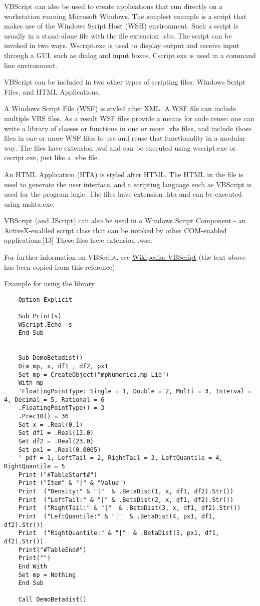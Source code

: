 	\vpara
	VBScript can also be used to create applications that run directly on a workstation running Microsoft Windows. The simplest example is a script that makes use of the Windows Script Host (WSH) environment. Such a script is usually in a stand-alone file with the file extension .vbs. The script can be invoked in two ways. Wscript.exe is used to display output and receive input through a GUI, such as dialog and input boxes. Cscript.exe is used in a command line environment.
	
	\vpara
	VBScript can be included in two other types of scripting files: Windows Script Files, and HTML Applications.
	
	\vpara
	A Windows Script File (WSF) is styled after XML. A WSF file can include multiple VBS files. As a result WSF files provide a means for code reuse: one can write a library of classes or functions in one or more .vbs files, and include those files in one or more WSF files to use and reuse that functionality in a modular way. The files have extension .wsf and can be executed using wscript.exe or cscript.exe, just like a .vbe file.
	
	\vpara
	An HTML Application (HTA) is styled after HTML. The HTML in the file is used to generate the user interface, and a scripting language such as VBScript is used for the program logic. The files have extension .hta and can be executed using mshta.exe.
	
	\vpara
	VBScript (and JScript) can also be used in a Windows Script Component - an ActiveX-enabled script class that can be invoked by other COM-enabled applications.[13] These files have extension .wsc.
	
	For further information on VBScript, see \href{http://en.wikipedia.org/wiki/VBScript}{Wikipedia: VBScript} (the text above has been copied from this reference).
	
	\vpara
	\noindent Example for using the library
	
	\begin{lstlisting}
	Option Explicit
	
	Sub Print(s)
	WScript.Echo  s
	End Sub
	
	
	Sub DemoBetadist()
	Dim mp, x, df1 , df2, px1 
	Set mp = CreateObject("mpNumerics.mp_Lib")
	With mp
	'FloatingPointType: Single = 1, Double = 2, Multi = 3, Interval = 4, Decimal = 5, Rational = 6
	.FloatingPointType() = 3
	.Prec10() = 36
	Set x = .Real(0.1)
	Set df1 = .Real(13.0)
	Set df2 = .Real(23.0)
	Set px1 = .Real(0.0005)	
	' pdf = 1, LeftTail = 2, RightTail = 3, LeftQuantile = 4, RightQuantile = 5
	Print ("#TableStart#")
	Print ("Item" & "|" & "Value")
	Print  ("Density:" & "|"  & .BetaDist(1, x, df1, df2).Str())
	Print  ("LeftTail:" & "|" & .BetaDist(2, x, df1, df2).Str())
	Print  ("RightTail:" & "|"  & .BetaDist(3, x, df1, df2).Str())
	Print  ("LeftQuantile:" & "|"  & .BetaDist(4, px1, df1, df2).Str())
	Print  ("RightQuantile:" & "|"  & .BetaDist(5, px1, df1, df2).Str())
	Print("#TableEnd#")
	Print("")
	End With
	Set mp = Nothing
	End Sub
	
	Call DemoBetadist()
	\end{lstlisting}
	
